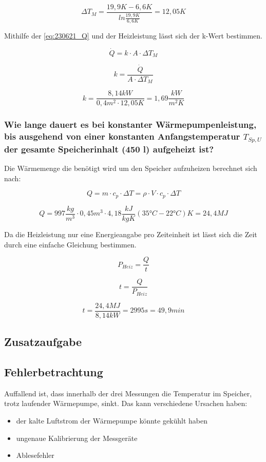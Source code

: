 $$\Delta T_M= \frac{19,9K-6,6K}{ln\frac{19,9K}{6,6K}}= 12,05K$$

Mithilfe der \autoref{eq:230621_Q} und der Heizleistung lässt sich der k-Wert bestimmen.

\begin{equation}
    \dot{Q}=k\cdot A \cdot \Delta T_M
    \label{eq:230621_Q}
\end{equation}

\begin{equation}
    k = \frac{\dot{Q}}{ A \cdot \Delta T_M} 
    \label{eq:230621_k}
\end{equation}

$$k=\frac{8,14 kW}{ 0,4m^2 \cdot 12,05K}=1,69 \frac{kW}{m^2K}$$

\subsubsection{Wie lange dauert es bei konstanter Wärmepumpenleistung, bis ausgehend von einer
konstanten Anfangstemperatur \texorpdfstring{$T_{Sp,U}$}{} der gesamte Speicherinhalt (450 l) aufgeheizt ist?}

Die Wärmemenge die benötigt wird um den Speicher aufzuheizen berechnet sich nach:

\begin{equation}
Q = m \cdot c_p \cdot \Delta T = \rho \cdot V \cdot c_p \cdot \Delta T
\end{equation}

$$ Q = 997 \frac{kg}{m^3} \cdot 0,45 m^3 \cdot 4,18 \frac{kJ}{kg K} (35 \text{°} C-22 \text{°} C)K=24,4 MJ$$

Da die Heizleistung nur eine Energieangabe pro Zeiteinheit ist lässt sich die Zeit durch eine einfache Gleichung bestimmen.

\begin{equation}
    P_{Heiz}= \frac{Q}{t}
\end{equation}

\begin{equation}
 t = \frac{Q}{P_{Heiz}}
\end{equation}

$$ t= \frac{24,4 MJ}{8,14 kW}=2995 s= 49,9 min$$

\subsection{Zusatzaufgabe}

\subsection{Fehlerbetrachtung}
Auffallend ist, dass innerhalb der drei Messungen die Temperatur im Speicher,
trotz laufender Wärmepumpe, sinkt. Das kann verschiedene Ursachen haben:
\begin{itemize}
    \item der kalte Luftstrom der Wärmepumpe könnte gekühlt haben 
\item ungenaue Kalibrierung der Messgeräte
\item Ablesefehler
\end{itemize}


